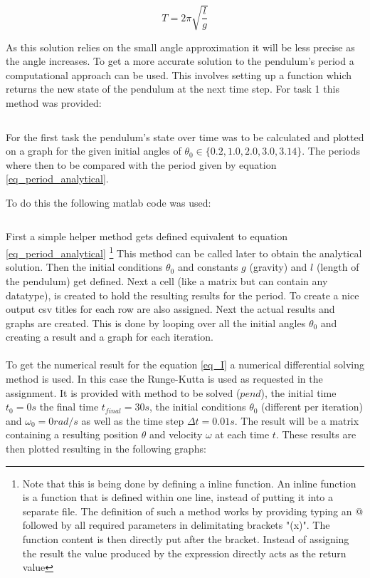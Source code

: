 \documentclass[14pt]{article}
\begin{document}
\begin{equation}\label{eq_period_analytical}
  T = 2 \pi \sqrt{\frac{l}{g}}
\end{equation}

As this solution relies on the small angle approximation it will be less precise as the angle increases.
To get a more accurate solution to the pendulum's period a computational approach can be used. This involves
setting up a function which returns the new state of the pendulum at the next time step. For task 1 this
method was provided:
\inputminted[linenos]{octave}{./matlab/make_pend.m}

For the first task the pendulum's state over time was to be calculated and plotted on a graph for the given initial angles of 
$ \theta_0 \in \{0.2, 1.0, 2.0, 3.0, 3.14\} $. The periods where then to be compared with the period given by equation \ref{eq_period_analytical}.

To do this the following matlab code was used:

\inputminted[linenos]{octave}{./matlab/assignment_1.m}

First a simple helper method gets defined equivalent to equation \ref{eq_period_analytical} \footnote{Note that this is being done by defining a inline function.
An inline function is a function that is defined within one line, instead of putting it into a separate file. The definition of such a method works by providing
typing an @ followed by all required parameters in delimitating brackets "(x)". The function content is then directly put after the bracket. Instead of assigning
the result the value produced by the expression directly acts as the return value} This method can be called later to obtain the analytical solution. Then the initial conditions
$\theta_0$ and constants $g$ (gravity) and $l$ (length of the pendulum) get defined. Next a cell (like a matrix but can contain any datatype),
is created to hold the resulting results for the period. To create a nice output csv titles for each row
are also assigned. Next the actual results and graphs are created. This is done by looping over all the initial
angles $\theta_0$ and creating a result and a graph for each iteration.\\
\\
To get the numerical result for the equation \ref{eq_I} a numerical differential solving method is used. In this
case the Runge-Kutta is used as requested in the assignment. It is provided with method to be solved ($pend$), the
initial time $t_0 = 0s$ the final time $t_{final} = 30s$, the initial conditions $\theta_0$ (different per iteration) and $\omega_0 = 0rad/s$ as well
as the time step $\Delta t = 0.01s$. The result will be a matrix containing a resulting position $\theta$ and
velocity $\omega$ at each time $t$. These results are then plotted resulting in the following graphs:
\end{document}
